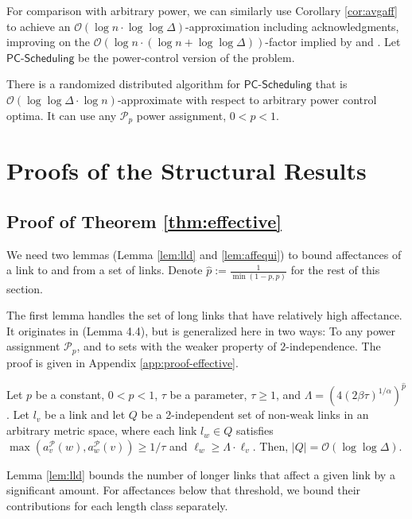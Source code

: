 \documentclass[11pt]{amsart}
\newcommand{\cal}[1]{\mathcal{#1}}
\newcommand{\BO}{\mathcal{O}}
\def\calP{{\cal P}}
\newcommand{\prob}[1]{\textsf{#1}}  \newcommand{\alg}[1]{\textbf{#1}}
\def\calP{{\cal P}}   \def\calM{{\cal M}}   \def\calU{{\cal U}}   \newcommand{\PCopt}{\overline{OPT}}
\newcommand{\sched}{\prob{PC-Scheduling}}
\newcommand{\powp}{\calP_p}
\begin{document}
For comparison with arbitrary power, we can
similarly use Corollary \ref{cor:avgaff} to achieve an $\BO(\log n \cdot 
\log\log\Delta)$-approximation including acknowledgments,
improving on the $\BO(\log n \cdot (\log n + \log\log\Delta))$-factor 
implied by \cite{KV10} and \cite{SODA11}.
Let $\sched$ be the power-control version of the problem.

\begin{corollary}
There is a randomized distributed algorithm for $\sched$ that is
$\BO(\log\log \Delta \cdot \log n)$-approximate with respect to
arbitrary power control optima. It can use any $\powp$ power assignment, $0 < p
< 1$.
\end{corollary}


\section{Proofs of the Structural Results}
\label{sec:proofs}
\subsection{Proof of Theorem \ref{thm:effective}}
We need two lemmas (Lemma \ref{lem:lld} and \ref{lem:affequi})
to bound affectances of a link to and from a set of links.
Denote $\hat{p} := \frac{1}{\min(1-p,p)}$ for the rest of this section.

The first lemma handles the set of long links that have relatively high affectance.
It originates in \cite{us:esa09full} (Lemma 4.4), but is 
generalized here in two ways: To any power assignment $\powp$, and to
sets with the weaker property of $2$-independence. The proof 
is given in Appendix \ref{app:proof-effective}.




\begin{lemma}
Let $p$ be a constant, $0 < p < 1$, $\tau$ be a parameter, $\tau \ge
1$, and $\Lambda = (4 (2\beta \tau)^{1/\alpha})^{\hat{p}}$.  
Let $l_v$ be a link and 
let $Q$ be a 2-independent set of non-weak links in an arbitrary
metric space, where each link $l_w \in Q$ satisfies $\max(a_{v}^\calP(w),a_{w}^\calP(v)) \ge 1/\tau$
and $\ell_w \ge \Lambda \cdot \ell_v$.
Then, $|Q| = \BO(\log\log \Delta)$.
\label{lem:lld}
\end{lemma}


Lemma \ref{lem:lld} bounds the number of longer links that affect a
given link by a significant amount. For affectances below that
threshold, we bound their contributions for each length class separately.
\end{document}
